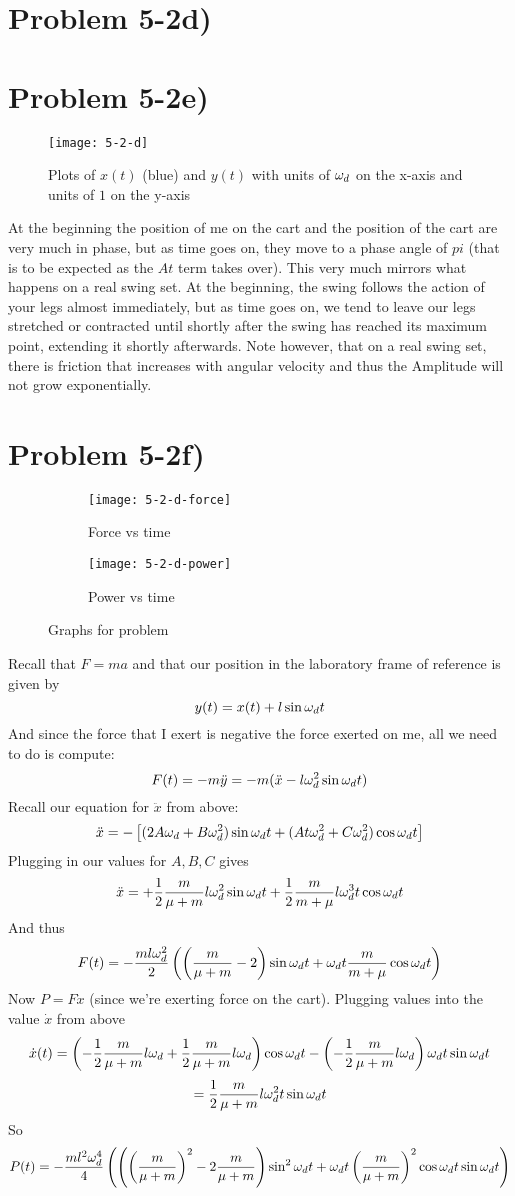 \section*{Problem 5-2d)}
\section*{Problem 5-2e)}
\begin{wrapfigure}{r}{0.5\textwidth}
\texttt{[image: 5-2-d]}
\label{fig:2-1-a}
\caption{Plots of $x(t)$ (blue) and $y(t)$ with units of $\omega_d$ on the x-axis and units of $1$ on the y-axis}
\vspace{50pt}
\end{wrapfigure}
At the beginning the position of me on the cart and the position of the cart are very much in phase, but as time goes on, they move to a phase angle of $pi$ (that is to be expected as the $At$ term takes over). This very much mirrors what happens on a real swing set. At the beginning, the swing follows the action of your legs almost immediately, but as time goes on, we tend to leave our legs stretched or contracted until shortly after the swing has reached its maximum point, extending it shortly afterwards. Note however, that on a real swing set, there is friction that increases with angular velocity and thus the Amplitude will not grow exponentially. \newpage
\section*{Problem 5-2f)}
\begin{figure}[h]
\centering
\begin{subfigure}[b]{0.49\textwidth}
\texttt{[image: 5-2-d-force]}
\label{fig:2-1-a}
\caption{Force vs time}
\end{subfigure}
\begin{subfigure}[b]{0.49\textwidth}
\texttt{[image: 5-2-d-power]}
\label{fig:2-1-a}
\caption{Power vs time}
\end{subfigure}
\caption{Graphs for problem }
\end{figure}
Recall that $F=ma$ and that our position in the laboratory frame of reference is given by
\[ y(t) = x(t) + l\sin\omega_d t \]
And since the force that I exert is negative the force exerted on me, all we need to do is compute:
\[ F(t) =-m\ddot{y} = -m(\ddot{x} - l\omega_d^2\sin\omega_d t) \]
Recall our equation for $\ddot{x}$ from above:
\[ \ddot{x} = -\left[ (2A\omega_d+B\omega_d^2)\sin\omega_d t + (At\omega_d^2 +C\omega_d^2)\cos\omega_d t \right] \]
Plugging in our values for $A,B,C$ gives
\[ \ddot{x} = +\frac{1}{2}\frac{m}{\mu +m}l\omega_d^2\sin\omega_d t+ \frac{1}{2}\frac{m}{m+\mu}l\omega_d^3 t\cos\omega_d t \]
And thus
\[ F(t) = - \frac{ml\omega_d^2}{2} \left( \left( \frac{m}{\mu + m}-2\right)\sin\omega_d t + \omega_d t\frac{m}{m+\mu}\cos\omega_d t\right) \]
Now $P=F\dot{x}$ (since we're exerting force on the cart). Plugging values into the value $\dot{x}$ from above 
\[ \dot{x}(t) = \left(-\frac{1}{2}\frac{m}{\mu + m}l\omega_d+\frac{1}{2}\frac{m}{\mu + m}l \omega_d\right) \cos\omega_d t - \left(-\frac{1}{2}\frac{m}{\mu + m}l\omega_d\right) \omega_d t\sin\omega_d t \]
\[ = \frac{1}{2}\frac{m}{\mu + m}l \omega_d^2 t \sin\omega_d t \]
So 
\[ P(t) = - \frac{ml^2\omega_d^4}{4}  \left( \left( \left(\frac{m}{\mu + m}\right)^2-2\frac{m}{\mu + m}\right)\sin^2 \omega_d t + \omega_d t\left(\frac{m}{\mu + m}\right)^2\cos\omega_d t\sin\omega_d t \right) \]
